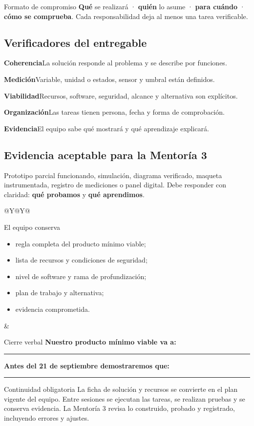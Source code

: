 \documentclass[10pt,a4paper]{article}
\newcommand{\criterion}[3]{%
  \begin{tcolorbox}[colback=#3!7,colframe=#3,boxrule=0.5pt,arc=1mm,left=2mm,right=2mm,top=1.6mm,bottom=1.6mm,before skip=2pt,after skip=2pt]
  {\bfseries\textcolor{AIEPNavy}{#1}}\hfill{\small #2}
  \end{tcolorbox}
}
\begin{document}
\begin{navybox}{Formato de compromiso}
\textbf{Qué} se realizará · \textbf{quién} lo asume · \textbf{para cuándo} · \textbf{cómo se comprueba}. Cada responsabilidad deja al menos una tarea verificable.
\end{navybox}

\subsection{Verificadores del entregable}
\criterion{Coherencia}{La solución responde al problema y se describe por funciones.}{AIEPRed}
\criterion{Medición}{Variable, unidad o estados, sensor y umbral están definidos.}{AIEPCyan}
\criterion{Viabilidad}{Recursos, software, seguridad, alcance y alternativa son explícitos.}{AIEPGold}
\criterion{Organización}{Las tareas tienen persona, fecha y forma de comprobación.}{AIEPGreen}
\criterion{Evidencia}{El equipo sabe qué mostrará y qué aprendizaje explicará.}{AIEPRed}

\subsection{Evidencia aceptable para la Mentoría 3}
Prototipo parcial funcionando, simulación, diagrama verificado, maqueta instrumentada, registro de mediciones o panel digital. Debe responder con claridad: \textbf{qué probamos} y \textbf{qué aprendimos}.

\begin{tabularx}{\textwidth}{@{}Y@{\hspace{5mm}}Y@{}}
\begin{docbox}[height=53mm]{El equipo conserva}
\begin{itemize}
  \item regla completa del producto mínimo viable;
  \item lista de recursos y condiciones de seguridad;
  \item nivel de software y rama de profundización;
  \item plan de trabajo y alternativa;
  \item evidencia comprometida.
\end{itemize}
\end{docbox}
&
\begin{docbox}[height=53mm]{Cierre verbal}
\textbf{Nuestro producto mínimo viable va a:}
\vspace{3mm}
\hrule
\vspace{5mm}
\textbf{Antes del 21 de septiembre demostraremos que:}
\vspace{3mm}
\hrule
\end{docbox}
\end{tabularx}

\begin{accentbox}{Continuidad obligatoria}
La ficha de solución y recursos se convierte en el plan vigente del equipo. Entre sesiones se ejecutan las tareas, se realizan pruebas y se conserva evidencia. La Mentoría 3 revisa lo construido, probado y registrado, incluyendo errores y ajustes.
\end{accentbox}
\end{document}
